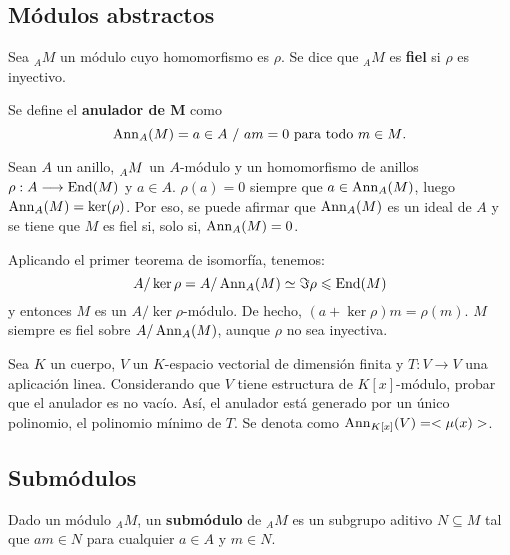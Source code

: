 \subsection{Módulos abstractos}

\begin{df}
  Sea \({}_AM\) un módulo cuyo homomorfismo es \(\rho\). Se dice que \({}_AM\) es
  \textbf{fiel} si \(\rho\) es inyectivo.
\end{df}
\begin{df}
  Se define el \textbf{anulador de M} como
  \[\operatorname{Ann}_A(M) = {a \in A \ /\ am = 0\ \text{para todo}\ m \in M}.\]
\end{df}

\begin{obs}
  Sean \(A\) un anillo, \(\prescript{}{A}{M}\) un \(A\)-módulo y
  un homomorfismo de anillos \(\rho:A\longrightarrow\operatorname{End}(M)\) y \(a \in A\).
  \(\rho(a) = 0\) siempre que \(a \in \operatorname{Ann}_A(M)\), luego \(\operatorname{Ann}_A(M) = \ker(\rho)\).
  Por eso, se puede afirmar que \(\operatorname{Ann}_A(M)\) es un ideal de \(A\) y se tiene que
  \(M\) es fiel si, solo si, \(\operatorname{Ann}_A(M) = {0}\).

  Aplicando el primer teorema de isomorfía, tenemos:
  \[
    A/\ker\rho = A/\operatorname{Ann}_A(M) \simeq \Im\rho \leqslant \operatorname{End}(M)
  \]
  \noindent y entonces \(M\) es un \(A/\ker\rho\)-módulo.
  De hecho, \((a+\ker\rho)m=\rho(m)\).
  \(M\) siempre es fiel sobre \(A/\operatorname{Ann}_A(M)\), aunque \(\rho\) no sea inyectiva.
\end{obs}

\begin{ejercicio}\label{ejer:anuladorV}
  Sea \(K\) un cuerpo, \(V\) un \(K\)-espacio vectorial de dimensión finita y
  \(T:V \longrightarrow V\) una aplicación linea. Considerando que \(V\) tiene estructura
  de \(K[x]\)-módulo, probar que el anulador es no vacío. Así, el anulador está
  generado por un único polinomio, el polinomio mínimo de \(T\).
  Se denota como \(\operatorname{Ann}_{K[x]}(V) = < \mu(x) >\).
\end{ejercicio}

\subsection{Submódulos}
\begin{df}
  Dado un módulo \({}_AM\), un \textbf{submódulo} de \({}_AM\)
  es un subgrupo aditivo \(N\subseteq M\)
  tal que \(am\in N\) para cualquier \(a\in A\) y \(m\in N\).
\end{df}

